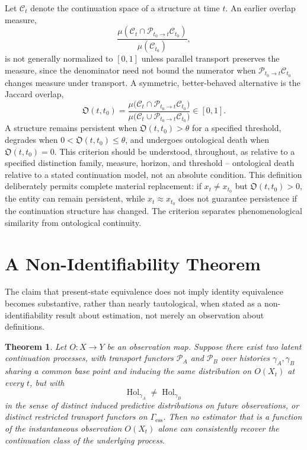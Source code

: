 \documentclass[11pt]{article}
\newtheorem{theorem}{Theorem}[section]
\newcommand{\Hol}{\operatorname{Hol}}
\begin{document}
Let $\mathcal{C}_t$ denote the continuation space of a structure at time $t$. An earlier overlap measure,
\[
\frac{\mu(\mathcal{C}_t \cap \mathcal{P}_{t_0 \to t}\mathcal{C}_{t_0})}{\mu(\mathcal{C}_{t_0})},
\]
is not generally normalized to $[0,1]$ unless parallel transport preserves the measure, since the denominator need not bound the numerator when $\mathcal{P}_{t_0\to t}\mathcal{C}_{t_0}$ changes measure under transport. A symmetric, better-behaved alternative is the Jaccard overlap,
\[
\mathfrak{O}(t, t_0) = \frac{\mu\bigl(\mathcal{C}_t \cap \mathcal{P}_{t_0\to t}\mathcal{C}_{t_0}\bigr)}{\mu\bigl(\mathcal{C}_t \cup \mathcal{P}_{t_0\to t}\mathcal{C}_{t_0}\bigr)} \in [0,1].
\]
A structure remains persistent when $\mathfrak{O}(t,t_0) > \theta$ for a specified threshold, degrades when $0 < \mathfrak{O}(t,t_0) \leq \theta$, and undergoes ontological death when $\mathfrak{O}(t,t_0) = 0$. This criterion should be understood, throughout, as relative to a specified distinction family, measure, horizon, and threshold -- ontological death relative to a stated continuation model, not an absolute condition. This definition deliberately permits complete material replacement: if $x_t \neq x_{t_0}$ but $\mathfrak{O}(t,t_0) > 0$, the entity can remain persistent, while $x_t \approx x_{t_0}$ does not guarantee persistence if the continuation structure has changed. The criterion separates phenomenological similarity from ontological continuity.

\section{A Non-Identifiability Theorem}

The claim that present-state equivalence does not imply identity equivalence becomes substantive, rather than nearly tautological, when stated as a non-identifiability result about estimation, not merely an observation about definitions.

\begin{theorem}
Let $O : X \to Y$ be an observation map. Suppose there exist two latent continuation processes, with transport functors $\mathcal{P}_A$ and $\mathcal{P}_B$ over histories $\gamma_A, \gamma_B$ sharing a common base point and inducing the same distribution on $O(X_t)$ at every $t$, but with
\[
\Hol_{\gamma_A} \neq \Hol_{\gamma_B}
\]
in the sense of distinct induced predictive distributions on future observations, or distinct restricted transport functors on $\Gamma_{\mathrm{ess}}$. Then no estimator that is a function of the instantaneous observation $O(X_t)$ alone can consistently recover the continuation class of the underlying process.
\end{theorem}
\end{document}
